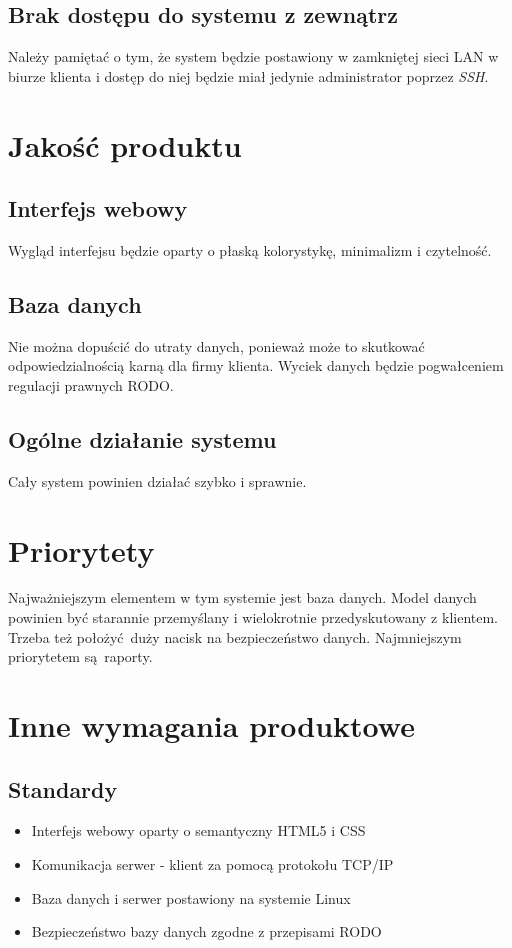 \documentclass{article}
\begin{document}
\subsection{Brak dostępu do systemu z zewnątrz}
Należy pamiętać o tym, że system będzie postawiony w zamkniętej sieci LAN w biurze klienta i dostęp do niej będzie miał jedynie administrator poprzez \textit{SSH}.
\section{Jakość produktu}
\subsection{Interfejs webowy}
Wygląd interfejsu będzie oparty o płaską kolorystykę, minimalizm i czytelność.
\subsection{Baza danych}
Nie można dopuścić do utraty danych, ponieważ może to skutkować odpowiedzialnością karną dla firmy klienta.
Wyciek danych będzie pogwałceniem regulacji prawnych RODO.
\subsection{Ogólne działanie systemu}
Cały system powinien działać szybko i sprawnie.
\section{Priorytety}
Najważniejszym elementem w tym systemie jest baza danych. Model danych powinien być starannie przemyślany
i wielokrotnie przedyskutowany z klientem. Trzeba też położyć duży nacisk na bezpieczeństwo danych.
Najmniejszym priorytetem są raporty.
\section{Inne wymagania produktowe}
\subsection{Standardy}
\begin{itemize}
    \item Interfejs webowy oparty o semantyczny HTML5 i CSS
    \item Komunikacja serwer - klient za pomocą protokołu TCP/IP
    \item Baza danych i serwer postawiony na systemie Linux
    \item Bezpieczeństwo bazy danych zgodne z przepisami RODO
\end{itemize}
\end{document}
